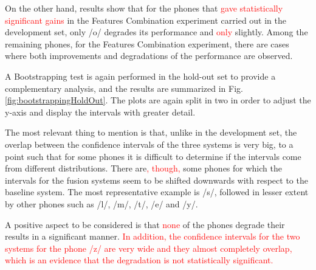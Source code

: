On the other hand, results show that
for the phones that \textcolor{red}{gave statistically significant gains} in the
Features Combination experiment carried out in the development set, only /o/ degrades
its performance and \textcolor{red}{only} slightly.
Among the remaining phones, for the Features Combination experiment,
there are cases where both improvements
and degradations of the performance are observed.

A Bootstrapping test is again performed in the hold-out set to provide a complementary analysis,
and the results are summarized in Fig. \ref{fig:bootstrappingHoldOut}.
The plots are again split in two in order to adjust the y-axis and display the intervals
with greater detail.

The most relevant thing to mention is that, unlike in the development set, the overlap
between the confidence intervals of the three systems is very big, to a point such that
for some phones it is difficult to determine if the intervals come from different
distributions. There are\textcolor{red}{, though,} some phones for which the intervals
for the fusion systems seem to be
shifted downwards with respect to the baseline system. The most representative example
is /s/, followed in lesser extent by other phones such as /l/, /m/, /t/, /e/ and /y/.

A positive aspect to be considered is that \textcolor{red}{none} of the phones degrade their
results in a significant manner. \textcolor{red}{In addition,
the confidence intervals
for the two systems for the phone /z/ are very wide and they almost completely overlap,
which is an evidence that the degradation is not statistically significant.}



